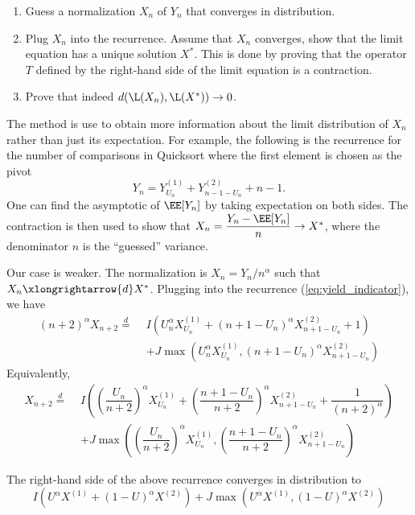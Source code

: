 \begin{enumerate}
  \item Guess a normalization $X_n$ of $Y_n$ that converges in distribution.
  \item Plug $X_n$ into the recurrence. Assume that $X_n$ converges, show that the limit equation has a unique solution $X^*$. This is done by proving that the operator $T$ defined by the right-hand side of the limit equation is a contraction.
  \item Prove that indeed $d(\L(X_n), \L(X^*)) \to 0$.
\end{enumerate}

The method is use to obtain more information about the limit distribution of $X_n$ rather than just its expectation. For example, the following is the recurrence for the number of comparisons in Quicksort where the first element is chosen as the pivot \cite{drmota2009random}
$$Y_{n} = Y_{U_n}^{(1)} + Y_{n-1-U_n}^{(2)} + n-1.$$
One can find the asymptotic of $\EE[Y_n]$ by taking expectation on both sides. The contraction is then used to show that $X_n = \dfrac{Y_n - \EE[Y_n]}{n}\to X^*$, where the denominator $n$ is the ``guessed'' variance.

Our case is weaker. The normalization is $X_n = Y_n / n^{\alpha}$ such that $X_n\xlongrightarrow{d}X^*$. Plugging into the recurrence (\ref{eq:yield_indicator}), we have
\begin{align*}
  (n+2)^\alpha X_{n+2} \stackrel{d}{=} \,\,
   & I\left(U_n^\alpha X_{U_n}^{(1)} + (n+1-U_n)^\alpha X_{n+1-U_n}^{(2)} + 1\right)  \\
   & + J\max\left(U_n^\alpha X_{U_n}^{(1)}, (n+1-U_n)^\alpha X_{n+1-U_n}^{(2)}\right)
\end{align*}
Equivalently,
\begin{equation}
  \begin{aligned}
    X_{n+2} \stackrel{d}{=}\,\,
     & I\left(\left(\dfrac{U_n}{n+2}\right)^\alpha X_{U_n}^{(1)} + \left(\dfrac{n+1-U_n}{n+2}\right)^\alpha X_{n+1-U_n}^{(2)} + \dfrac{1}{(n+2)^\alpha}\right) \\
     & + J\max\left(\left(\dfrac{U_n}{n+2}\right)^\alpha X_{U_n}^{(1)}, \left(\dfrac{n+1-U_n}{n+2}\right)^\alpha X_{n+1-U_n}^{(2)}\right)
  \end{aligned}
\end{equation}

\begin{proposition}
  The right-hand side of the above recurrence converges in distribution to
  \begin{equation}
    I\left(U^\alpha X^{(1)} + (1-U)^\alpha X^{(2)}\right) + J\max\left(U^\alpha X^{(1)}, (1-U)^\alpha X^{(2)}\right)
  \end{equation}
\end{proposition}

